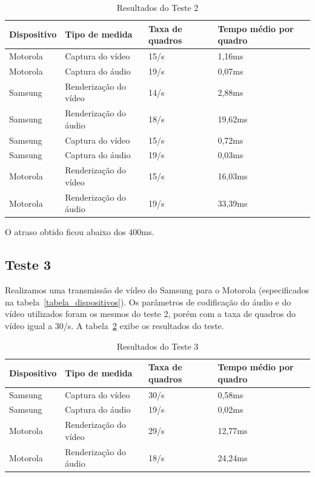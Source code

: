 \documentclass{acm_proc_article-sp}
\begin{document}
\begin{table}[htp]
\centering
\caption{Resultados do Teste 2}
\label{tabela_teste2}
\begin{tabular}{|p{1.5cm}|p{2.5cm}|p{1.2cm}|p{1.2cm}|} \hline
Dispositivo&Tipo de medida&Taxa de quadros&Tempo médio por quadro\\ \hline
Motorola&Captura do vídeo&15/s&1,16ms\\ \hline
Motorola&Captura do áudio&19/s&0,07ms\\ \hline
Samsung&Renderização do vídeo&14/s&2,88ms\\ \hline
Samsung&Renderização do áudio&18/s&19,62ms\\ \hline
Samsung&Captura do vídeo&15/s&0,72ms\\ \hline
Samsung&Captura do áudio&19/s&0,03ms\\ \hline
Motorola&Renderização do vídeo&15/s&16,03ms\\ \hline
Motorola&Renderização do áudio&19/s&33,39ms\\
\hline\end{tabular}
\end{table}

O atraso obtido ficou abaixo dos 400ms.

\subsection{Teste 3}
Realizamos uma transmissão de vídeo do Samsung para o Motorola (especificados na tabela~\ref{tabela_dispositivos}). Os parâmetros de codificação do áudio e do vídeo utilizados foram os mesmos do teste 2, porém com a taxa de quadros do vídeo igual a 30/s. A tabela~\ref{tabela_teste3} exibe os resultados do teste.

\begin{table}[htp]
\centering
\caption{Resultados do Teste 3}
\label{tabela_teste3}
\begin{tabular}{|p{1.5cm}|p{2.5cm}|p{1.2cm}|p{1.2cm}|} \hline
Dispositivo&Tipo de medida&Taxa de quadros&Tempo médio por quadro\\ \hline
Samsung&Captura do vídeo&30/s&0,58ms\\ \hline
Samsung&Captura do áudio&19/s&0,02ms\\ \hline
Motorola&Renderização do vídeo&29/s&12,77ms\\ \hline
Motorola&Renderização do áudio&18/s&24,24ms\\
\hline\end{tabular}
\end{table}
\end{document}
